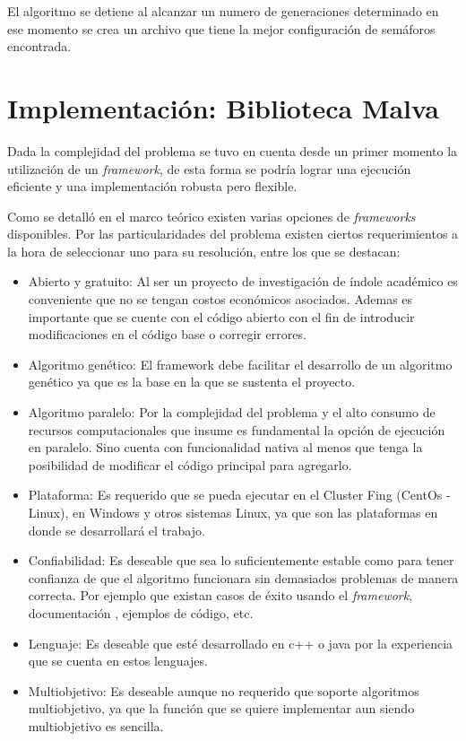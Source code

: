 El algoritmo se detiene al alcanzar un numero de generaciones determinado en ese momento se crea un archivo que tiene la mejor configuración de semáforos encontrada.




\section{Implementación: Biblioteca Malva}

Dada la complejidad del problema se tuvo en cuenta desde un primer momento la utilización de un \emph{framework}, de esta forma se podría lograr una ejecución eficiente y una implementación robusta pero flexible. 

Como se detalló en el marco teórico existen varias opciones de \emph{frameworks} disponibles. Por las particularidades del problema existen ciertos requerimientos a la hora de seleccionar  uno para su resolución, entre los que se destacan:

\begin{itemize}
	\item Abierto y gratuito: Al ser un proyecto de investigación de índole académico es conveniente que no se tengan costos económicos asociados. Ademas es importante que se cuente con el código abierto con el fin de introducir modificaciones en el código base o corregir errores.
	\item Algoritmo genético: El framework debe facilitar el desarrollo de un algoritmo genético ya que es la base en la que se sustenta el proyecto.
	\item Algoritmo paralelo: Por la complejidad del problema y el alto consumo de recursos computacionales que insume es fundamental la opción de ejecución en paralelo. Sino cuenta con funcionalidad nativa al menos que tenga la posibilidad de modificar el código principal para agregarlo.
	\item Plataforma: Es requerido que se pueda ejecutar en el Cluster Fing (CentOs - Linux), en Windows y otros sistemas Linux, ya que son las plataformas en donde se desarrollará el trabajo.
	\item Confiabilidad: Es deseable que sea lo suficientemente estable como para tener confianza de que el algoritmo funcionara sin demasiados problemas de manera correcta. Por ejemplo que existan casos de éxito usando el \emph{framework}, documentación , ejemplos de código, etc.
	\item Lenguaje: Es deseable que esté desarrollado en c++ o java por la experiencia que se cuenta en estos lenguajes. 
	\item Multiobjetivo: Es deseable aunque no requerido que soporte algoritmos multiobjetivo, ya que la función que se quiere implementar aun siendo multiobjetivo es sencilla.	
\end{itemize} 

